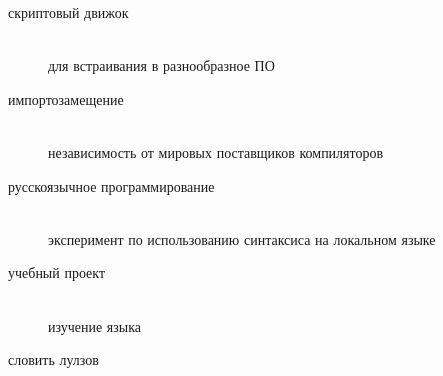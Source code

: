 \clearpage{}\label{intro}

\begin{description}
    \item[скриптовый движок]\ \\для встраивания в разнообразное ПО
    \item[импортозамещение]\ \\независимость от мировых поставщиков компиляторов
    \item[русскоязычное программирование]\ \\эксперимент по использованию
    синтаксиса на локальном языке
    \item[учебный проект]\ \\изучение языка \D
    \item[словить лулзов]
\end{description}
